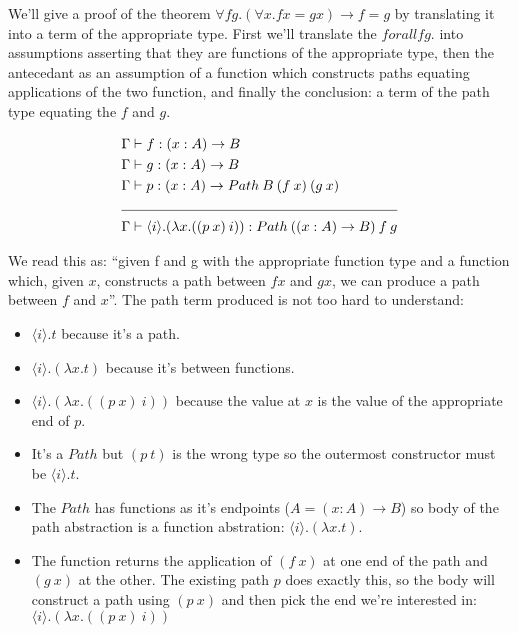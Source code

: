 \documentclass[a4paper]{article}
\newcommand{\fun}[3]{(#1 : #2) \rightarrow #3}
\newcommand{\labs}[2]{(\lambda #1 . #2)}
\newcommand{\lapp}[2]{(#1 \: #2)}
\newcommand{\pabs}[2]{{\langle #1 \rangle}.{#2}}
\newcommand{\papp}[2]{(#1 \: #2)}
\newcommand{\Path}[3]{{Path\:{#1}\:{#2}\:{#3}}}
\begin{document}
We'll give a proof of the theorem $\forall f g. (\forall x. f x = g x)
\rightarrow f = g$ by translating it into a term of the appropriate
type. First we'll translate the $forall f g.$ into assumptions
asserting that they are functions of the appropriate type, then the
antecedant as an assumption of a function which constructs paths
equating applications of the two function, and finally the conclusion:
a term of the path type equating the $f$ and $g$.

\begin{align}
  \Gamma &\vdash f : \fun{x}{A}{B} \\
  \Gamma &\vdash g : \fun{x}{A}{B} \\
  \Gamma &\vdash p : \fun{x}{A}{\Path{B}{\lapp{f}{x}}{\lapp{g}{x}}} \\
  \cline{1-2}
  \Gamma &\vdash \pabs{i}{\labs{x}{
      \papp{\lapp{p}{x}}{i}
  }} : \Path{(\fun{x}{A}{B})}{f}{g}
\end{align}

We read this as: ``given f and g with the appropriate function type
and a function which, given $x$, constructs a path between $f x$ and
$g x$, we can produce a path between $f$ and $x$''. The path term
produced is not too hard to understand:

\begin{itemize}
  \item $\pabs{i}{t}$ because it's a path.
  \item $\pabs{i}{\labs{x}{t}}$ because it's between functions.
  \item $\pabs{i}{\labs{x}{\papp{\lapp{p}{x}}{i}}}$ because the value
    at $x$ is the value of the appropriate end of $p$.
\end{itemize}

\begin{itemize}
  \item It's a $Path$ but $\lapp{p}{t}$ is the wrong type so the
    outermost constructor must be $\pabs{i}{t}$.
  \item The $Path$ has functions as it's endpoints ($A =
    \fun{x}{A}{B}$) so body of the path abstraction is a function
    abstration: $\pabs{i}{\labs{x}{t}}$.
  \item The function returns the application of $\lapp{f}{x}$ at one
    end of the path and $\lapp{g}{x}$ at the other. The existing path
    $p$ does exactly this, so the body will construct a path using
    $\lapp{p}{x}$ and then pick the end we're interested in: $\pabs{i}{\labs{x}{\papp{\lapp{p}{x}}{i}}}$
\end{itemize}
\end{document}
